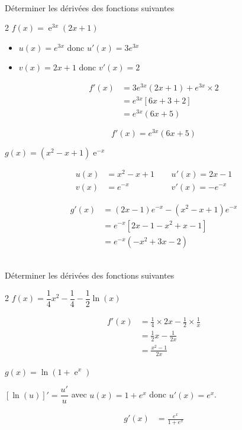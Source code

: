 \documentclass[11pt,a4paper]{article}
\DeclareMathOperator{\e}{e}
\newcommand{\cor}[1]{%
\begin{tcolorbox}[colback=red!5!white,colframe=red!75!black]
#1
\end{tcolorbox}
}
\begin{document}
\\[5 pt]
Déterminer les dérivées des fonctions suivantes
\begin{multicols}{2}
$f(x)=\e^{3x}(2x+1) $
\vfill
\begin{tcolorbox}[colback=red!5!white,colframe=red!75!black]
\begin{itemize}
\item $u(x) = e^{3x}$ donc $u'(x) = 3e^{3x}$
\item $v(x) = 2x+1$ donc $v'(x) = 2$
\end{itemize}

\begin{align*}
f'(x) &= 3e^{3x}(2x+1) + e^{3x} \times 2 \\
&= e^{3x}[6x + 3 + 2] \\
&= e^{3x}(6x + 5)
\end{align*}


$$\boxed{f'(x) = e^{3x}(6x + 5)}$$

\end{tcolorbox}

$g(x)=(x^2-x+1)\e^{-x}$
\vfill

\begin{tcolorbox}[colback=red!5!white,colframe=red!75!black]
\begin{align*}
u(x)& = x^2-x+1 & ~~ &  u'(x) = 2x-1 \\
v(x) & = e^{-x} &  ~~ &  v'(x) = -e^{-x}
\end{align*}

\begin{align*}
g'(x) &= (2x-1)e^{-x} - (x^2-x+1)e^{-x} \\
&= e^{-x}[2x - 1 - x^2 + x - 1] \\
&= e^{-x}(-x^2 + 3x - 2)
\end{align*}

\end{tcolorbox}


\end{multicols}


\\[5 pt]
Déterminer les dérivées des fonctions suivantes
\begin{multicols}{2}
$f(x)=\dfrac{1}{4}x^2-\dfrac{1}{4}-\dfrac{1}{2}\ln(x)$
\vfill
\cor{\begin{align*}
f'(x) &= \frac{1}{4} \times 2x - \frac{1}{2} \times \frac{1}{x} \\
&= \frac{1}{2}x - \frac{1}{2x} \\
&= \frac{x^2 - 1}{2x}
\end{align*}
}

\columnbreak

$g(x)= \ln\left(1+\e^x \right)$
\cor{$[\ln(u)]' = \dfrac{u'}{u}$ avec $u(x) = 1+e^x$ donc $u'(x) = e^x$.

\begin{align*}
g'(x) &= \frac{e^x}{1+e^x}
\end{align*}

\vspace{0.5cm}
}
\end{multicols}
\end{document}
